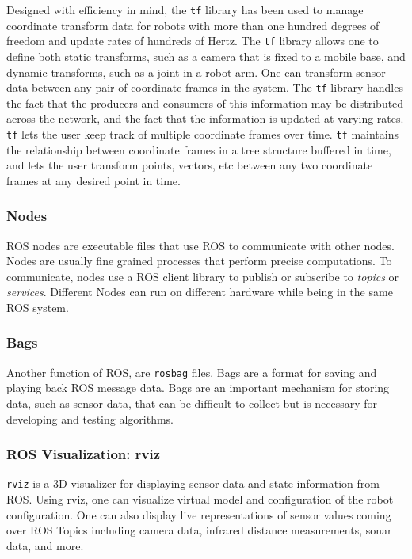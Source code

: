 Designed with efficiency in mind, the \texttt{tf} library has been used to manage coordinate transform data for robots with more than one hundred degrees of freedom and update rates of hundreds of Hertz. The \texttt{tf} library allows one to define both static transforms, such as a camera that is fixed to a mobile base, and dynamic transforms, such as a joint in a robot arm. One can transform sensor data between any pair of coordinate frames in the system. The \texttt{tf} library handles the fact that the producers and consumers of this information may be distributed across the network, and the fact that the information is updated at varying rates.\\
\texttt{tf} lets the user keep track of multiple coordinate frames over time. \texttt{tf} maintains the relationship between coordinate frames in a tree structure buffered in time, and lets the user transform points, vectors, etc between any two coordinate frames at any desired point in time.

\subsubsection*{Nodes}
\ac{ROS} nodes are executable files that use \ac{ROS} to communicate with other nodes. Nodes are usually fine grained processes that perform precise computations. To communicate, nodes use a ROS client library to publish or subscribe to \emph{topics} or \emph{services}. Different Nodes can run on different hardware while being in the same \ac{ROS} system.

\subsubsection*{Bags}
Another function of \ac{ROS}, are \lstinline|rosbag| files. Bags are a format for saving and playing back ROS message data. Bags are an important mechanism for storing data, such as sensor data, that can be difficult to collect but is necessary for developing and testing algorithms.

\subsubsection*{ROS Visualization: rviz}
\texttt{rviz} is a 3D visualizer for displaying sensor data and state information from ROS. Using rviz, one can visualize virtual model and configuration of the robot configuration. One can also display live representations of sensor values coming over ROS Topics including camera data, infrared distance measurements, sonar data, and more.

